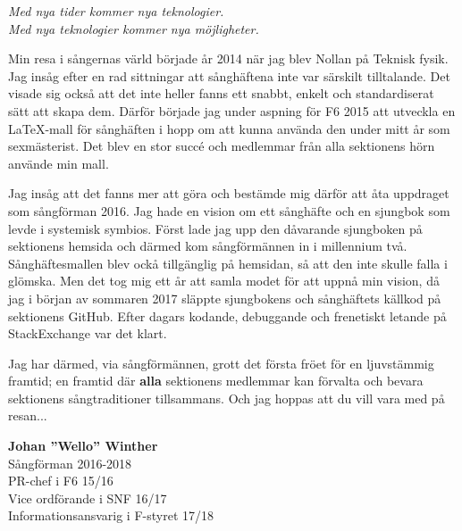 {\large
\setlength{\parskip}{0.8em}
\textit{Med nya tider kommer nya teknologier.}\\
\textit{Med nya teknologier kommer nya möjligheter.}

Min resa i sångernas värld började år 2014 när jag blev Nollan på Teknisk fysik. Jag insåg efter en rad sittningar att sånghäftena inte var särskilt tilltalande. Det visade sig också att det inte heller fanns ett snabbt, enkelt och standardiserat sätt att skapa dem.
Därför började jag under aspning för F6 2015 att utveckla en LaTeX-mall för sånghäften i hopp om att kunna använda den under mitt år som sexmästerist.
Det blev en stor succé och medlemmar från alla sektionens hörn använde min mall.

Jag insåg att det fanns mer att göra och bestämde mig därför att åta uppdraget som sångförman 2016.
Jag hade en vision om ett sånghäfte och en sjungbok som levde i systemisk symbios.
Först lade jag upp den dåvarande sjungboken på sektionens hemsida och därmed kom sångförmännen in i millennium två.
Sånghäftesmallen blev ockå tillgänglig på hemsidan, så att den inte skulle falla i glömska.
Men det tog mig ett år att samla modet för att uppnå min vision, då jag i början av sommaren 2017 släppte sjungbokens och sånghäftets källkod på sektionens GitHub.
Efter dagars kodande, debuggande och frenetiskt letande på StackExchange var det klart.

Jag har därmed, via sångförmännen, grott det första fröet för en ljuvstämmig framtid; en framtid där \textbf{alla} sektionens medlemmar kan förvalta och bevara sektionens sångtraditioner tillsammans. Och jag hoppas att du vill vara med på resan...

\begin{flushright}
\textbf{Johan ''Wello'' Winther}\\
Sångförman 2016-2018\\
PR-chef i F6 15/16\\
Vice ordförande i SNF 16/17\\
Informationsansvarig i F-styret 17/18\\
\end{flushright}
}

